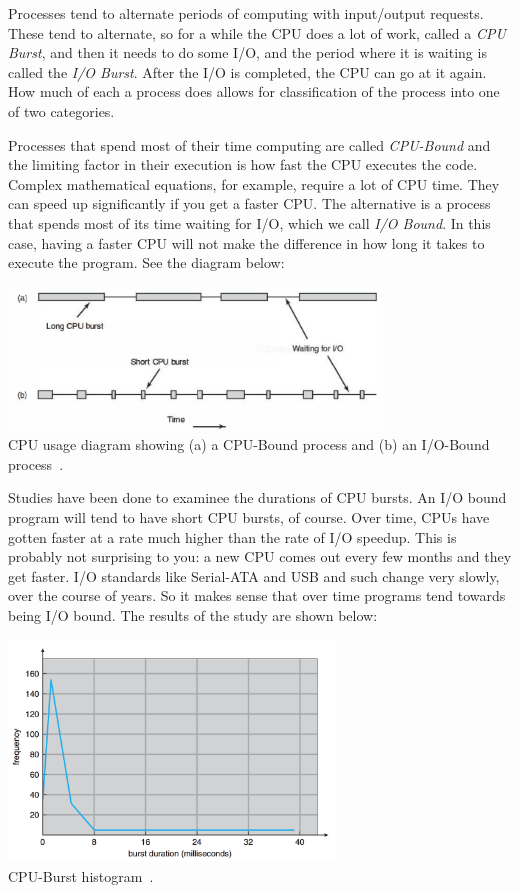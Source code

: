 Processes tend to alternate periods of computing with input/output requests. These tend to alternate, so for a while the CPU does a lot of work, called a \textit{CPU Burst}, and then it needs to do some I/O, and the period where it is waiting is called the \textit{I/O Burst}. After the I/O is completed, the CPU can go at it again. How much of each a process does allows for classification of the process into one of two categories.

Processes that spend most of their time computing are called \textit{CPU-Bound} and the limiting factor in their execution is how fast the CPU executes the code. Complex mathematical equations, for example, require a lot of CPU time. They can speed up significantly if you get a faster CPU. The alternative is a process that spends most of its time waiting for I/O, which we call \textit{I/O Bound}. In this case, having a faster CPU will not make the difference in how long it takes to execute the program. See the diagram below:

\begin{center}
\includegraphics[width=0.75\textwidth]{images/cpu-io-bound.png}\\
CPU usage diagram showing (a) a CPU-Bound process and (b) an I/O-Bound process~\cite{mos}.
\end{center}

Studies have been done to examinee the durations of CPU bursts. An I/O bound program will tend to have short CPU bursts, of course. Over time, CPUs have gotten faster at a rate much higher than the rate of I/O speedup. This is probably not surprising to you: a new CPU comes out every few months and they get faster. I/O standards like Serial-ATA and USB and such change very slowly, over the course of years. So it makes sense that over time programs tend towards being I/O bound. The results of the study are shown below:

\begin{center}
\includegraphics[width=0.65\textwidth]{images/cpu-burst-histogram.png}\\
CPU-Burst histogram~\cite{osc}.
\end{center}


